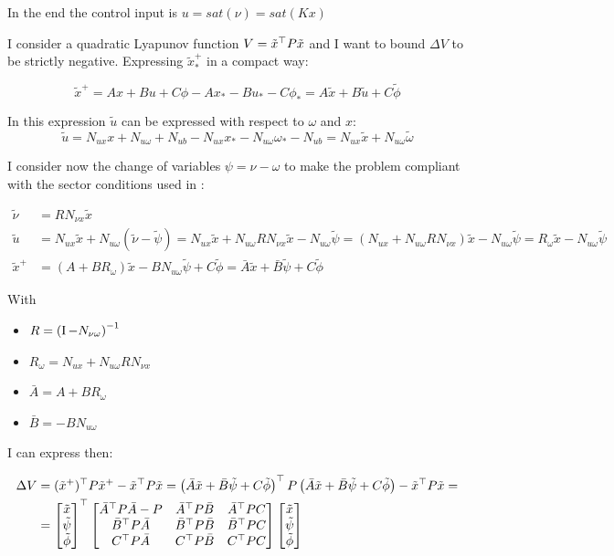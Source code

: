 \documentclass{article}
\begin{document}
In the end the control input is $u = sat(\nu) = sat(K x)$

I consider a quadratic Lyapunov function $V = \tilde{x}^\top P \tilde{x}$ and I want to bound $\Delta V$ to be strictly negative.
Expressing $\tilde{x}_*^{+}$ in a compact way:

$$
  \tilde{x}^{+} = A x + B u + C \phi - A x_* - B u_* - C \phi_* = A \tilde{x} + B \tilde{u} + C \tilde{\phi}
$$

In this expression $\tilde{u}$ can be expressed with respect to $\omega$ and $x$:
$$
  \tilde{u} = N_{ux} x + N_{u \omega} + N_{ub} - N_{ux} x_* - N_{u \omega} \omega_* - N_{ub} = N_{ux} \tilde{x} + N_{u \omega} \tilde{\omega}
$$

I consider now the change of variables $\psi = \nu - \omega$ to make the problem compliant with the sector conditions used in \cite{css-extended}:

\begin{align*}
  \tilde{\nu} &= R N_{\nu x} \tilde{x} \\
  \tilde{u} &= N_{ux} \tilde{x} + N_{u \omega} (\tilde{\nu} - \tilde{\psi}) = N_{ux} \tilde{x} + N_{u \omega} R N_{\nu x} \tilde{x} - N_{u \omega} \tilde{\psi} = (N_{ux} + N_{u \omega} R N_{\nu x}) \tilde{x} - N_{u \omega} \tilde{\psi} = R_{\omega} \tilde{x} - N_{u \omega} \tilde{\psi} \\
  \tilde{x}^{+} &= (A + B R_{\omega}) \tilde{x} - B N_{u \omega} \tilde{\psi} + C \tilde{\phi} = \bar{A} \tilde{x} + \bar{B} \tilde{\psi} + C \tilde{\phi}
\end{align*}

With \begin{itemize}
  \item $R = \left( \operatorname{I} - N_{\nu \omega} \right)^{-1}$
  \item $R_{\omega} = N_{ux} + N_{u \omega} R N_{\nu x}$
  \item $\bar{A} = A + B R_{\omega}$
  \item $\bar{B} = - B N_{u \omega}$
\end{itemize}

I can express then:

\begin{align} \label{matricione}
  \Delta V &= (\tilde{x}^{+})^\top P \tilde{x}^{+} - \tilde{x}^\top P \tilde{x} = \left( \bar{A} \tilde{x} + \bar{B} \tilde{\psi} + C \tilde{\phi} \right)^\top P \left( \bar{A} \tilde{x} + \bar{B} \tilde{\psi} + C \tilde{\phi} \right) - \tilde{x}^\top P \tilde{x} = \\
  &= \left[\begin{matrix}
    \tilde{x}\\
    \tilde{\psi}\\
    \tilde{\phi}
  \end{matrix}\right]^\top \left[\begin{matrix}
    \bar{A}^\top P \bar{A} - P & \bar{A}^\top P \bar{B} & \bar{A}^\top P C \\
    \bar{B}^\top P \bar{A} & \bar{B}^\top P \bar{B} & \bar{B}^\top P C \\
    C^\top P \bar{A} & C^\top P \bar{B} & C^\top P C
  \end{matrix}\right] \left[\begin{matrix}
    \tilde{x}\\
    \tilde{\psi}\\
    \tilde{\phi}
  \end{matrix}\right]
\end{align}
\end{document}
